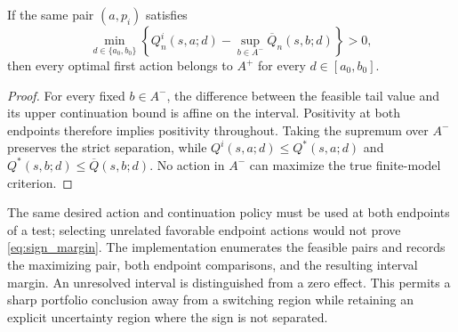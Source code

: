 \begin{proposition}
\label{thm:sign}
If the same pair $(a,p_i)$ satisfies
\begin{equation}
 \min_{d\in\{a_0,b_0\}}
 \left\{Q^i_n(s,a;d)-\sup_{b\in A^-}\overline Q_n(s,b;d)\right\}>0,
 \label{eq:sign_margin}
\end{equation}
then every optimal first action belongs to $A^+$ for every $d\in[a_0,b_0]$.
\end{proposition}

\begin{proof}
For every fixed $b\in A^-$, the difference between the feasible tail value and its upper continuation bound is affine on the interval. Positivity at both endpoints therefore implies positivity throughout. Taking the supremum over $A^-$ preserves the strict separation, while $Q^i(s,a;d)\leq Q^*(s,a;d)$ and $Q^*(s,b;d)\leq\overline Q(s,b;d)$. No action in $A^-$ can maximize the true finite-model criterion.
\end{proof}

The same desired action and continuation policy must be used at both endpoints of a test; selecting unrelated favorable endpoint actions would not prove \eqref{eq:sign_margin}. The implementation enumerates the feasible pairs and records the maximizing pair, both endpoint comparisons, and the resulting interval margin. An unresolved interval is distinguished from a zero effect. This permits a sharp portfolio conclusion away from a switching region while retaining an explicit uncertainty region where the sign is not separated.
